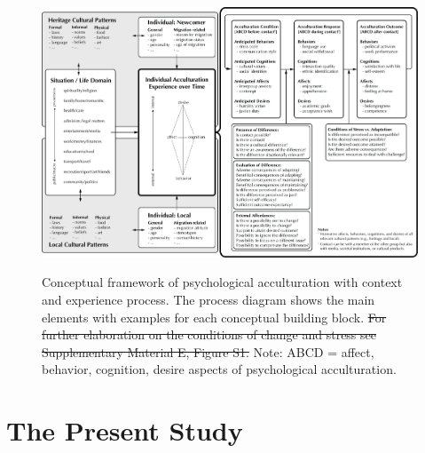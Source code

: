 \documentclass[man, 12pt, a4paper, mask]{apa7}
\newcommand\Warning[1][2ex]{%
  \renewcommand\stacktype{L}%
  \scaleto{\stackon[1.3pt]{\color{red}$\triangle$}{\tiny\bfseries !}}{#1}}%
\providecommand{\DIFdeltex}[1]{{\protect\color{red}\sout{#1}}}                      %
\providecommand{\DIFaddbegin}{} %
\providecommand{\DIFaddend}{} %
\providecommand{\DIFdelbegin}{} %
\providecommand{\DIFdelend}{} %
\providecommand{\DIFdel}[1]{\texorpdfstring{\DIFdeltex{#1}}{}} %
\newcommand{\DIFscaledelfig}{0.5}
\newlength{\DIFdelgraphicswidth} %
\newlength{\DIFdelgraphicsheight} %
\newcommand{\DIFaddincludegraphics}[2][]{{\color{blue}\fbox{\DIFOincludegraphics[#1]{#2}}}} %
\newcommand{\DIFdelincludegraphics}[2][]{%
\sbox{\DIFdelgraphicsbox}{\DIFOincludegraphics[#1]{#2}}%
\settoboxwidth{\DIFdelgraphicswidth}{\DIFdelgraphicsbox} %
\settoboxtotalheight{\DIFdelgraphicsheight}{\DIFdelgraphicsbox} %
\scalebox{\DIFscaledelfig}{%
\parbox[b]{\DIFdelgraphicswidth}{\usebox{\DIFdelgraphicsbox}\\[-\baselineskip] \rule{\DIFdelgraphicswidth}{0em}}\llap{\resizebox{\DIFdelgraphicswidth}{\DIFdelgraphicsheight}{%
\setlength{\unitlength}{\DIFdelgraphicswidth}%
\begin{picture}(1,1)%
\thicklines\linethickness{2pt} %
{\color[rgb]{1,0,0}\put(0,0){\framebox(1,1){}}}%
{\color[rgb]{1,0,0}\put(0,0){\line( 1,1){1}}}%
{\color[rgb]{1,0,0}\put(0,1){\line(1,-1){1}}}%
\end{picture}%
}\hspace*{3pt}}} %
} %
\DeclareRobustCommand{\DIFaddbegin}{\DIFOaddbegin \let\includegraphics\DIFaddincludegraphics} %
\DeclareRobustCommand{\DIFaddend}{\DIFOaddend \let\includegraphics\DIFOincludegraphics} %
\DeclareRobustCommand{\DIFdelbegin}{\DIFOdelbegin \let\includegraphics\DIFdelincludegraphics} %
\DeclareRobustCommand{\DIFdelend}{\DIFOaddend \let\includegraphics\DIFOincludegraphics} %
\begin{document}
\DIFdelend \begin{figure}
    \centering
    \caption{Conceptual framework of psychological acculturation with context and experience process. The process diagram shows the main elements with examples for each conceptual building block. \DIFdelbegin \DIFdel{For further elaboration on the conditions of change and stress see Supplementary Material E, Figure S1. }\DIFdelend Note: ABCD = affect, behavior, cognition, desire aspects of psychological acculturation.}
    \DIFdelbegin %
\DIFdelend \DIFaddbegin \includegraphics[width=\textwidth]{Figures/ConceptualFrameworkRevision.pdf}
    \DIFaddend \label{fig:ModelContext}
\end{figure}

\section{The Present Study}

\end{document}
